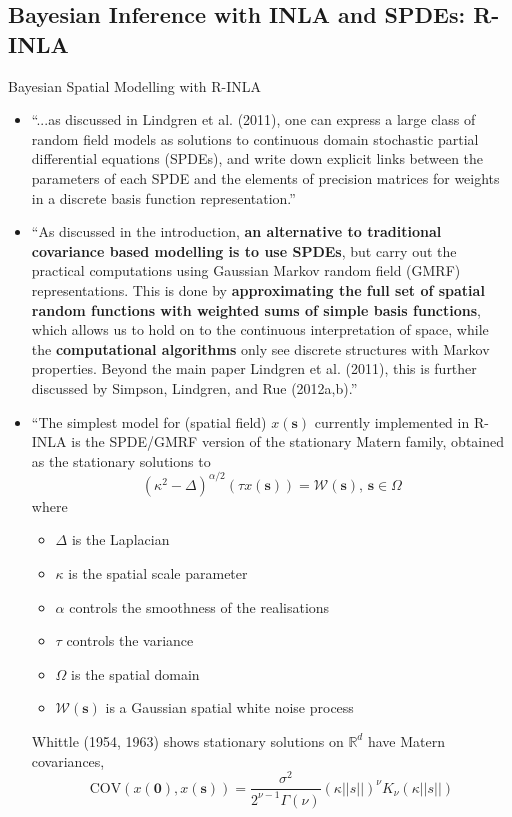 \documentclass{article}
\begin{document}
\subsection{Bayesian Inference with INLA and SPDEs: R-INLA}

Bayesian Spatial Modelling with R-INLA \citep{Lindgren2015}
\begin{itemize}
\item ``...as discussed in Lindgren et al. (2011), one can express a large class of random field models as solutions to continuous domain stochastic partial differential equations (SPDEs), and write down explicit links between the parameters of each SPDE and the elements of precision matrices for weights in a discrete basis function representation.''
\item ``As discussed in the introduction, {\bf an alternative to traditional covariance based modelling is to use SPDEs}, but carry out the practical computations using Gaussian Markov random field (GMRF) representations. This is done by {\bf approximating the full set of spatial random functions with weighted sums of simple basis functions}, which allows us to hold on to the continuous interpretation of space, while the {\bf computational algorithms} only see discrete structures with Markov properties. Beyond the main paper Lindgren et al. (2011), this is further discussed by Simpson, Lindgren, and Rue (2012a,b).''
\item ``The simplest model for (spatial field) $x(\pmb{s})$ currently implemented in R-INLA is the SPDE/GMRF version of the stationary Matern family, obtained as the stationary solutions to
$$ (\kappa^{2} - \Delta)^{\alpha/2}(\tau x(\pmb{s})) = \mathcal{W}(\pmb{s})\text{, } \pmb{s} \in \Omega $$ where
    \begin{itemize}
    \item $\Delta$ is the Laplacian
    \item $\kappa$ is the spatial scale parameter
    \item $\alpha$ controls the smoothness of the realisations
    \item $\tau$ controls the variance
    \item $\Omega$ is the spatial domain
    \item $\mathcal{W}(\pmb{s})$ is a Gaussian spatial white noise process
    \end{itemize}
Whittle (1954, 1963) shows stationary solutions on $\mathbb{R}^{d}$ have Matern covariances,
$$\text{COV}(x(\pmb{0}), x(\pmb{s})) = \frac{\sigma^{2}}{2^{\nu - 1}\Gamma(\nu)}(\kappa||s||)^{\nu}K_{\nu}(\kappa||s||)$$

\end{itemize}
\end{document}
